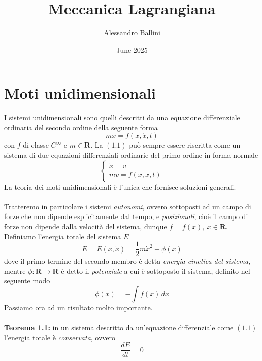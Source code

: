 \documentclass{article}
\title{Meccanica Lagrangiana}
\author{Alessandro Ballini}
\date{June 2025}
\begin{document}
\maketitle

\tableofcontents
\newpage

\section{Moti unidimensionali}
I sistemi unidimensionali sono quelli descritti da una equazione differenziale ordinaria del secondo ordine della seguente forma
\begin{equation}
    m\ddot{x} = f(x, \dot{x}, t) \tag{1.1}
\end{equation}
con $f$ di classe $C^{\infty}$ e $m \in \mathbf{R}$. La $(1.1)$ può sempre essere riscritta come un sistema di due equazioni differenziali ordinarie del primo ordine in forma normale
\begin{equation}
    \begin{cases}
        \dot{x} = v \\
        m\dot{v} = f(x, \dot{x}, t)
    \end{cases} \tag{1.2}
\end{equation}
La teoria dei moti unidimensionali è l'unica che fornisce soluzioni generali. \\ \\
Tratteremo in particolare i sistemi \textit{autonomi}, ovvero sottoposti ad un campo di forze che non dipende esplicitamente dal tempo, e \textit{posizionali}, cioè il campo di forze non dipende dalla velocità del sistema, dunque $f = f(x), \ x \in \mathbf{R}$. \\
Definiamo l'energia totale del sistema $E$
\begin{equation}
    E = E(x, \dot{x}) = \frac{1}{2}m\dot{x}^2 + \phi(x) \tag{1.3}
\end{equation}
dove il primo termine del secondo membro è detta \textit{energia cinetica del sistema}, mentre $\phi : \mathbf{R} \longrightarrow \mathbf{R}$ è detto il \textit{potenziale} a cui è sottoposto il sistema, definito nel seguente modo
\begin{equation}
    \phi(x) = - \int f(x) \, dx \tag{1.4}
\end{equation}
Passiamo ora ad un risultato molto importante. \\ \\
\textbf{Teorema 1.1:} in un sistema descritto da un'equazione differenziale come $(1.1)$ l'energia totale è \textit{conservata}, ovvero
\begin{equation}
    \frac{d E}{d t} = 0 \tag{1.5}
\end{equation}
\end{document}
